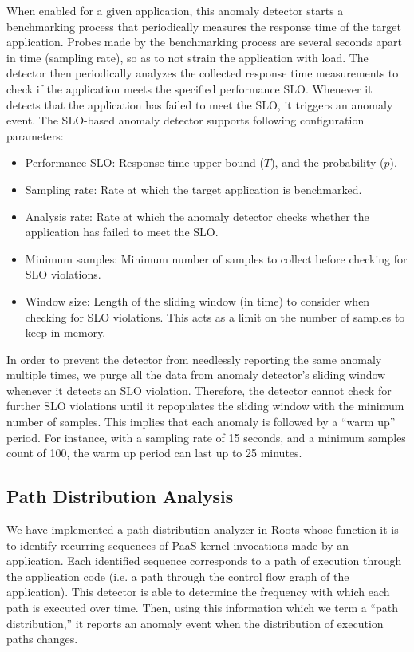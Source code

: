 When enabled for a given application, this anomaly detector starts a benchmarking process
that periodically measures the response time of the target application. Probes made by the benchmarking 
process are several seconds apart in time (sampling rate), so as to not strain the application with load.
The detector then periodically
analyzes the collected response time measurements to check if the application meets the specified performance
SLO. Whenever it detects that the application has failed to meet the SLO, it triggers an anomaly event. 
The SLO-based anomaly detector supports following configuration parameters:
\begin{itemize}
\item Performance SLO: Response time upper bound ($T$), and the probability ($p$).
\item Sampling rate: Rate at which the target application is benchmarked.
\item Analysis rate: Rate at which the anomaly detector checks whether the application has failed to meet the SLO.
\item Minimum samples: Minimum number of samples to collect before checking for SLO violations.
\item Window size: Length of the sliding window (in time) to consider when checking for SLO violations. This
acts as a limit on the number of samples to keep in memory.
\end{itemize}

In order to prevent the detector from needlessly reporting the same anomaly multiple times,
we purge all the data from anomaly detector's sliding window whenever it detects an SLO violation.
Therefore, the detector cannot check for further SLO violations until it repopulates the sliding window 
with the minimum number of samples. This implies that each anomaly is followed by a ``warm up'' period.
For instance, with a sampling rate of 15 seconds, and a minimum
samples count of 100, the warm up period can last up to 25 minutes.

\subsection{Path Distribution Analysis}

We have implemented a path distribution analyzer
in Roots whose function it is to identify recurring sequences of
PaaS kernel invocations made by an application.
Each identified sequence corresponds to a path of
execution through the application code (i.e. a path through the control flow graph of the application). 
This detector is able to determine the frequency with
which each path is executed over time. Then, using this information which we term
a ``path distribution,'' it reports an anomaly event when the distribution of execution paths
changes. 

